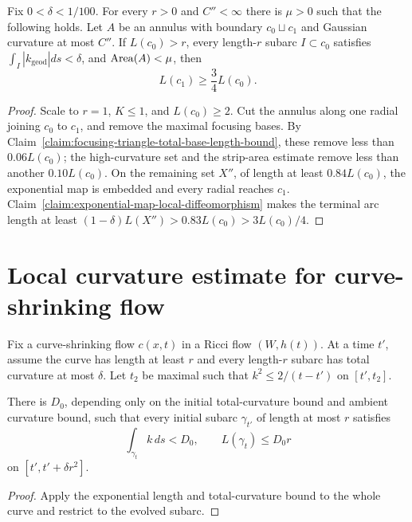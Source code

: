 \begin{proposition}
\label{prop:annulus-boundary-length-estimate}
\label{annlengthest}
Fix $0<\delta<1/100$. For every $r>0$ and $C''<\infty$ there is $\mu>0$ such
that the following holds. Let $A$ be an annulus with boundary $c_0\sqcup c_1$
and Gaussian curvature at most $C''$. If $L(c_0)>r$, every length-$r$ subarc
$I\subset c_0$ satisfies $\int_I|k_{\mathrm{geod}}|ds<\delta$, and
$\operatorname{Area}(A)<\mu$, then
\[
L(c_1)\ge\frac34L(c_0).
\]
\end{proposition}
\begin{proof}
\sketch Scale to $r=1$, $K\le1$, and $L(c_0)\ge2$. Cut the annulus along one
radial joining $c_0$ to $c_1$, and remove the maximal focusing bases. By
Claim~\ref{claim:focusing-triangle-total-base-length-bound}, these remove less
than $0.06L(c_0)$; the high-curvature set and the strip-area estimate remove
less than another $0.10L(c_0)$. On the remaining set $X''$, of length at least
$0.84L(c_0)$, the exponential map is embedded and every radial reaches $c_1$.
Claim~\ref{claim:exponential-map-local-diffeomorphism} makes the terminal arc
length at least $(1-\delta)L(X'')>0.83L(c_0)>3L(c_0)/4$.
\end{proof}

\section{Local curvature estimate for curve-shrinking flow}
\label{18.6}

Fix a curve-shrinking flow $c(x,t)$ in a Ricci flow $(W,h(t))$. At a time
$t'$, assume the curve has length at least $r$ and every length-$r$ subarc has
total curvature at most $\delta$. Let $t_2$ be maximal such that
$k^2\le2/(t-t')$ on $[t',t_2]$.

\begin{claim}
\label{claim:curve-shrinking-length-curvature-uniform-bound}
\label{C0claim}
There is $D_0$, depending only on the initial total-curvature bound and ambient
curvature bound, such that every initial subarc $\gamma_{t'}$ of length at most
$r$ satisfies
\[
\int_{\gamma_t}k\,ds<D_0,
\qquad L(\gamma_t)\le D_0r
\]
on $[t',t'+\delta r^2]$.
\end{claim}
\begin{proof}
\sketch Apply the exponential length and total-curvature bound to the whole curve and
restrict to the evolved subarc.
\end{proof}

